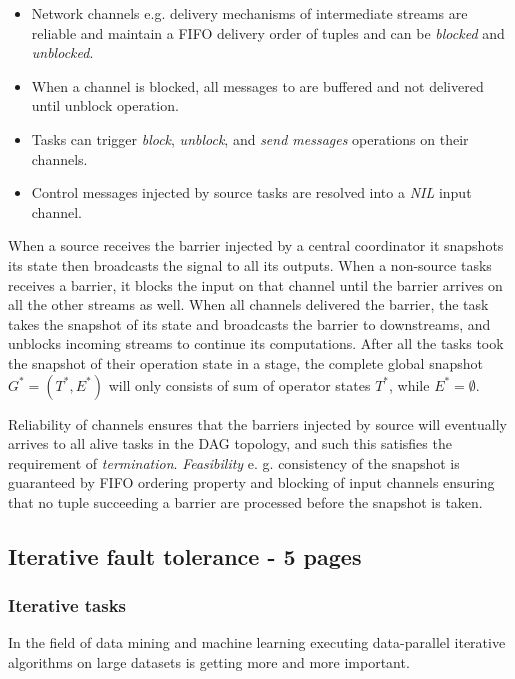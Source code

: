 \begin{itemize}
\item Network channels e.g. delivery mechanisms of intermediate streams are reliable and maintain a FIFO delivery order of tuples and can be 
\textit{blocked} and \textit{unblocked}.
\item When a channel is blocked, all messages to are buffered and not delivered until unblock operation.
\item Tasks can trigger \textit{block}, \textit{unblock}, and \textit{send messages} operations on their channels.
\item Control messages injected by source tasks are resolved into a \textit{NIL} input channel.
\end{itemize}

When a source  receives the barrier injected by a central coordinator it snapshots its state then broadcasts the signal to all its outputs. When a non-source tasks receives a barrier, it blocks the input on that channel until the barrier arrives on all the other streams as well. When all channels delivered the barrier, the task takes the snapshot of its state and broadcasts the barrier to downstreams, and unblocks incoming streams to continue its computations.
After all the tasks took the snapshot of their operation state in a stage, the complete global snapshot $G^{*} = (T^{*},E^{*})$ will only consists of sum of operator states $T^{*}$, while $E^{*}= \emptyset$.

Reliability of channels ensures that the barriers injected by source will eventually arrives to all alive tasks in the DAG topology, and such this  satisfies the requirement of \textit{termination}. \textit{Feasibility} e. g. consistency of the snapshot is guaranteed by FIFO ordering property and blocking of input channels ensuring that no tuple succeeding a barrier are processed before the snapshot is taken. 



\subsection{Iterative fault tolerance - 5 pages}
\subsubsection{Iterative tasks}
In the field of data mining and machine learning executing data-parallel iterative algorithms on large datasets is getting more and more important.
